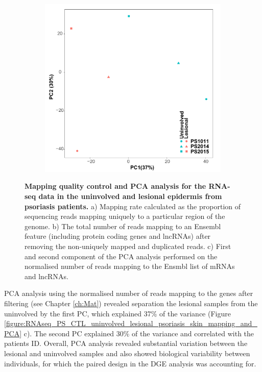 \begin{figure}[htbp]
\begin{subfigure}{0.4\textwidth}
\centering
\includegraphics[width=\textwidth]{./Results2/pdfs/PS_lesional_uninvolved_varied_PCA1and2_plot}
\caption{\textbf{}} %
\end{subfigure}%
\caption[Mapping quality control and PCA analysis for the RNA-seq data in the uninvolved and lesional epidermis from psoriasis patients.]{\textbf{Mapping quality control and PCA analysis for the RNA-seq data in the uninvolved and lesional epidermis from psoriasis patients.} a) Mapping rate calculated as the proportion of sequencing reads mapping uniquely to a particular region of the genome. b) The total number of reads mapping to an Ensembl feature (including protein coding genes and lncRNAs) after removing the non-uniquely mapped and duplicated reads. c) First and second component of the PCA analysis performed on the normalised number of reads mapping to the Ensmbl list of mRNAs and lncRNAs.}
\label{figure:RNAseq_PS_uninvolved_lesional_psoriasis_skin_mapping_and_PCA}
\end{figure} 

PCA analysis using the normalised number of reads mapping to the genes after filtering (see Chapter \ref{ch:Mat}) revealed separation the lesional samples from the uninvolved by the first PC, which explained 37\% of the variance (Figure \ref{figure:RNAseq_PS_CTL_uninvolved_lesional_psoriasis_skin_mapping_and_PCA} c). The second PC explained 30\% of the variance and correlated with the patients ID. Overall, PCA analysis revealed substantial variation between the lesional and uninvolved samples and also showed biological variability between individuals, for which the paired design in the DGE analysis was accounting for.  


